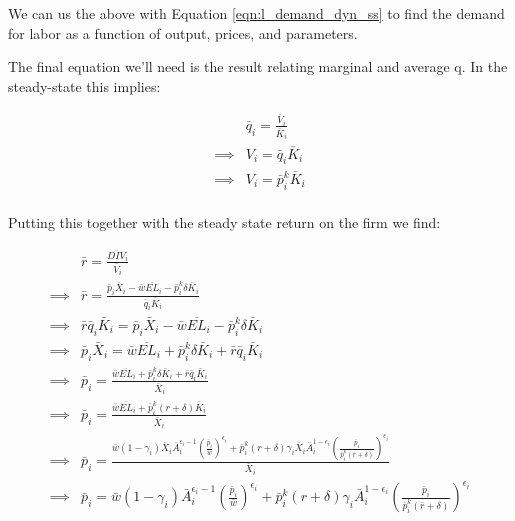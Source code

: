 \documentclass[letterpaper,12pt]{article}
\theoremstyle{definition}
\begin{document}
\begin{spacing}{1.5}
We can us the above with Equation \ref{eqn:l_demand_dyn_ss} to find the demand for labor as a function of output, prices, and parameters.



The final equation we'll need is the \citet{Hayashi1982} result relating marginal and average q.  In the steady-state this implies:

\begin{equation}
\label{eqn:ss_marg_avg_q}
\begin{split}
& \bar{q}_{i} = \frac{\bar{V}_{i}}{\bar{K}_{i}} \\
\implies & V_{i} = \bar{q}_{i}\bar{K}_{i} \\
\implies & V_{i} = \bar{p}^{k}_{i}\bar{K}_{i}  \\
\end{split}
\end{equation}

Putting this together with the steady state return on the firm we find:

\begin{equation}
\label{eqn:price_det_ss}
\begin{split}
&\bar{r} = \frac{\overline{DIV}_{i}}{\bar{V}_{i}} \\
\implies & \bar{r} = \frac{ \bar{p}_{i}\bar{X}_{i}-\bar{w}\overline{EL}_{i}-\bar{p}^{k}_{i}\delta \bar{K}_{i}}{\bar{q}_{i}\bar{K}_{i}} \\
\implies & \bar{r}\bar{q}_{i}\bar{K}_{i} = \bar{p}_{i}\bar{X}_{i}-\bar{w}\overline{EL}_{i}-\bar{p}^{k}_{i}\delta \bar{K}_{i} \\
\implies &  \bar{p}_{i}\bar{X}_{i} = \bar{w}\overline{EL}_{i} + \bar{p}^{k}_{i}\delta \bar{K}_{i} +  \bar{r}\bar{q}_{i}\bar{K}_{i} \\
\implies &   \bar{p}_{i} = \frac{\bar{w}\overline{EL}_{i} + \bar{p}^{k}_{i}\delta \bar{K}_{i} +  \bar{r}\bar{q}_{i}\bar{K}_{i}}{\bar{X}_{i}}\\
\implies &   \bar{p}_{i} = \frac{\bar{w}\overline{EL}_{i} + \bar{p}^{k}_{i}(r+\delta) \bar{K}_{i}}{\bar{X}_{i}}\\
\implies &\bar{p}_{i} = \frac{ \bar{w}(1-\gamma_{i})\bar{X}_{i}\bar{A}_{i}^{\epsilon_{i}-1}\left( \frac{ \bar{p}_{i}}{\bar{w}}\right)^{\epsilon_{i}}+\bar{p}^{k}_{i}(r+\delta)\gamma_{i}\bar{X}_{i}\bar{A}_{i}^{1-\epsilon_{i}} \left(\frac{\bar{p}_{i}}{\bar{p}^{k}_{i}(\bar{r}+\delta)} \right)^{\epsilon_{i}}}{\bar{X}_{i}} \\
\implies &\bar{p}_{i} = \bar{w}(1-\gamma_{i})\bar{A}_{i}^{\epsilon_{i}-1}\left( \frac{ \bar{p}_{i}}{\bar{w}}\right)^{\epsilon_{i}}+\bar{p}^{k}_{i}(r+\delta)\gamma_{i}\bar{A}_{i}^{1-\epsilon_{i}} \left(\frac{\bar{p}_{i}}{\bar{p}^{k}_{i}(\bar{r}+\delta)} \right)^{\epsilon_{i}}\\
\end{split}
\end{equation}


\end{spacing}
\end{document}
